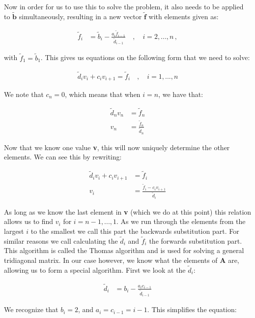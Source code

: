 \documentclass[english,notitlepage,reprint]{revtex4-1}  %
\begin{document}
Now in order for us to use this to solve the problem, it also needs to be applied to $\tilde{\textbf{b}}$ simultaneously, resulting in a new vector $\tilde{\textbf{f}}$ with elements given as:

\begin{align*}
\tilde{f}_i &= \tilde{b}_i - \frac{a_i \tilde{f}_{i-1}}{\tilde{d}_{i-1}} \quad , \quad i = 2,...,n \, ,
\end{align*}

with $\tilde{f}_1 = \tilde{b}_1$. This gives us equations on the following form that we need to solve:

\begin{align*}
\tilde{d}_i v_i  + c_i v_{i+1} = \tilde{f}_i \quad , \quad i = 1,...,n
\end{align*}

We note that $c_n = 0$, which means that when $i=n$, we have that:

\begin{align*}
\tilde{d}_n v_n &= \tilde{f}_n \\
v_n &= \frac{\tilde{f}_n}{\tilde{d}_n}
\end{align*}

Now that we know one value \textbf{v}, this will now uniquely determine the other elements. We can see this by rewriting:

\begin{align*}
\tilde{d}_i v_i  + c_i v_{i+1} &= \tilde{f}_i \\
v_i &= \frac{\tilde{f}_i - c_i v_{i+1}}{\tilde{d}_i}
\end{align*}

As long as we know the last element in \textbf{v} (which we do at this point) this relation allows us to find $v_i$ for $i = n-1,...,1$. As we run through the elements from the largest $i$ to the smallest we call this part the backwards substitution part. For similar reasons we call calculating the $\tilde{d}_i$ and $\tilde{f}_i$ the forwards substitution part. This algorithm is called the Thomas algorithm \citep{Thomas1949} and is used for solving a general tridiagonal matrix. In our case however, we know what the elements of \textbf{A} are, allowing us to form a special algorithm. First we look at the $\tilde{d}_i$:

\begin{align*}
\tilde{d}_i &= b_i - \frac{a_i c_{i-1}}{\tilde{d}_{i-1}}
\end{align*}

We recognize that $b_i = 2$, and $a_i = c_{i-1} = i-1$. This simplifies the equation:
\end{document}
